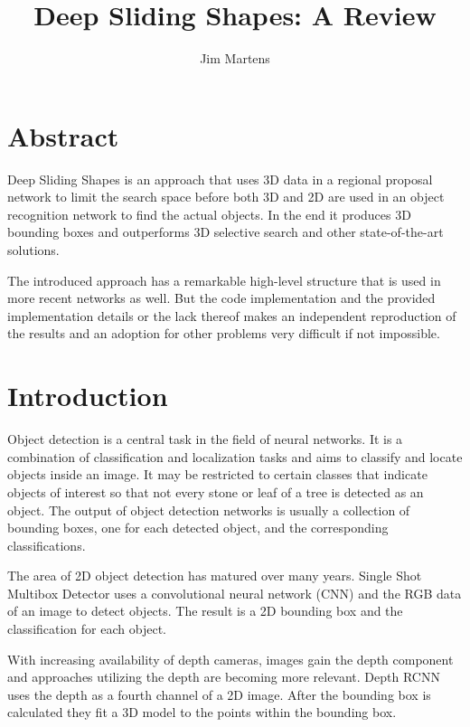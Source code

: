 \documentclass[12pt]{scrartcl}
\begin{document}
\title{Deep Sliding Shapes: A Review}
\author{Jim Martens}

\maketitle
\section*{Abstract}

Deep Sliding Shapes is an approach that uses 3D data in a regional proposal
network to limit the search space before both 3D and 2D are used in an object
recognition network to find the actual objects. In the end it produces 3D
bounding boxes and outperforms 3D selective search and other state-of-the-art
solutions.

The introduced approach has a remarkable high-level structure that is
used in more recent networks as well. But the code implementation and the
provided implementation details or the lack thereof makes an independent
reproduction of the results and an adoption for other problems very difficult
if not impossible.


\setcounter{tocdepth}{2} 					%
\tableofcontents
{}
\clearpage

\section{Introduction}

Object detection is a central task in the field of neural networks. It is a
combination of classification and localization tasks and aims to classify
and locate objects inside an image. It may be restricted to certain classes
that indicate objects of interest so that not every stone or leaf of a tree
is detected as an object. The output of object detection networks is usually
a collection of bounding boxes, one for each detected object, and the corresponding
classifications.

The area of 2D object detection has matured over many years. Single Shot Multibox
Detector\cite{Liu2016} uses a convolutional neural network (CNN) and the RGB
data of an image to detect objects. The result is a 2D bounding box and the
classification for each object.

With increasing availability of depth cameras, images gain the depth component
and approaches utilizing the depth are becoming more relevant. Depth RCNN\cite{Gupta2015}
uses the depth as a fourth channel of a 2D image. After the bounding box
is calculated they fit a 3D model to the points within the bounding box.
\end{document}
